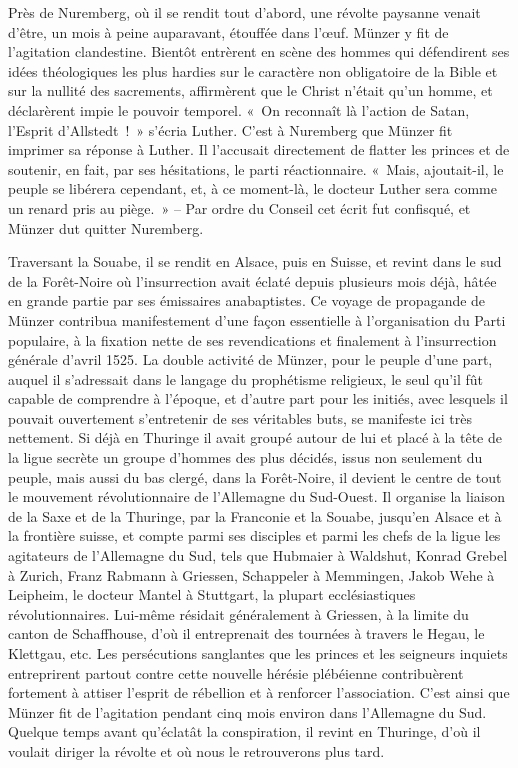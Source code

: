 \documentclass[french,twoside]{book} %
\begin{document}
Près de Nuremberg, où il se rendit tout d’abord, une révolte paysanne venait d’être, un mois à peine auparavant, étouffée dans l’œuf. Münzer y fit de l’agitation clandestine. Bientôt entrèrent en scène des hommes qui défendirent ses idées théologiques les plus hardies sur le caractère non obligatoire de la Bible et sur la nullité des sacrements, affirmèrent que le Christ n’était qu’un homme, et déclarèrent impie le pouvoir temporel. « On reconnaît là l’action de Satan, l’Esprit d’Allstedt ! » s’écria Luther. C’est à Nuremberg que Münzer fit imprimer sa réponse à Luther. Il l’accusait directement de flatter les princes et de soutenir, en fait, par ses hésitations, le parti réactionnaire. « Mais, ajoutait-il, le peuple se libérera cependant, et, à ce moment-là, le docteur Luther sera comme un renard pris au piège. » – Par ordre du Conseil cet écrit fut confisqué, et Münzer dut quitter Nuremberg.\par
Traversant la Souabe, il se rendit en Alsace, puis en Suisse, et revint dans le sud de la Forêt-Noire où l’insurrection avait éclaté depuis plusieurs mois déjà, hâtée en grande partie par ses émissaires anabaptistes. Ce voyage de propagande de Münzer contribua manifestement d’une façon essentielle à l’organisation du Parti populaire, à la fixation nette de ses revendications et finalement à l’insurrection générale d’avril 1525. La double activité de Münzer, pour le peuple d’une part, auquel il s’adressait dans le langage du prophétisme religieux, le seul qu’il fût capable de comprendre à l’époque, et d’autre part pour les initiés, avec lesquels il pouvait ouvertement s’entretenir de ses véritables buts, se manifeste ici très nettement. Si déjà en Thuringe il avait groupé autour de lui et placé à la tête de la ligue secrète un groupe d’hommes des plus décidés, issus non seulement du peuple, mais aussi du bas clergé, dans la Forêt-Noire, il devient le centre de tout le mouvement révolutionnaire de l’Allemagne du Sud-Ouest. Il organise la liaison de la Saxe et de la Thuringe, par la Franconie et la Souabe, jusqu’en Alsace et à la frontière suisse, et compte parmi ses disciples et parmi les chefs de la ligue les agitateurs de l’Allemagne du Sud, tels que Hubmaier à Waldshut, Konrad Grebel à Zurich, Franz Rabmann à Griessen, Schappeler à Memmingen, Jakob Wehe à Leipheim, le docteur Mantel à Stuttgart, la plupart ecclésiastiques révolutionnaires. Lui-même résidait généralement à Griessen, à la limite du canton de Schaffhouse, d’où il entreprenait des tournées à travers le Hegau, le Klettgau, etc. Les persécutions sanglantes que les princes et les seigneurs inquiets entreprirent partout contre cette nouvelle hérésie plébéienne contribuèrent fortement à attiser l’esprit de rébellion et à renforcer l’association. C’est ainsi que Münzer fit de l’agitation pendant cinq mois environ dans l’Allemagne du Sud. Quelque temps avant qu’éclatât la conspiration, il revint en Thuringe, d’où il voulait diriger la révolte et où nous le retrouverons plus tard.\par
\end{document}
